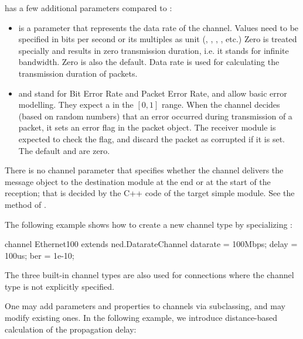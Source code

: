 has a few additional parameters compared to :

\begin{itemize}
    \item {} is a  parameter that represents the
          data rate of the channel. Values need to be specified
          in bits per second or its multiples as unit (,
          , , , etc.) Zero is treated
          specially and results in zero transmission duration, i.e.
          it stands for infinite bandwidth. Zero is also the default.
          Data rate is used for calculating the transmission duration of
          packets.
    \item {} and  stand for Bit Error Rate and Packet Error Rate,
          and allow basic error modelling. They expect a 
          in the $[0,1]$ range. When the channel decides (based on random
          numbers) that an error occurred during transmission of a packet,
          it sets an error flag in the packet object. The receiver
          module is expected to check the flag, and discard the packet
          as corrupted if it is set. The default  and 
          are zero.
\end{itemize}

\begin{note}
    There is no channel parameter that specifies whether the channel
    delivers the message object to the destination module at the end or
    at the start of the reception; that is decided by the C++ code
    of the target simple module. See the 
    method of .
\end{note}

The following example shows how to create a new channel type by
specializing :

\begin{ned}
channel Ethernet100 extends ned.DatarateChannel
{
    datarate = 100Mbps;
    delay = 100us;
    ber = 1e-10;
}
\end{ned}

\begin{note}
    The three built-in channel types are also used for connections where
    the channel type is not explicitly specified.
\end{note}

One may add parameters and properties to channels via subclassing, and
may modify existing ones. In the following example, we introduce distance-based
calculation of the propagation delay:

